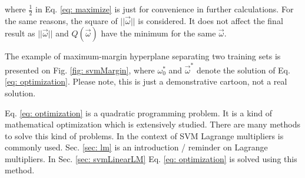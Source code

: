 where $\frac{1}{2}$ in Eq. \ref{eq: maximize} is just for convenience in further calculations. For the same reasons, the square of $||\vec\omega||$ is considered. It does not affect the final result as $||\vec\omega||$ and $Q(\vec\omega)$ have the minimum for the same $\vec\omega$. 

The example of maximum-margin hyperplane separating two training sets is presented on Fig. \ref{fig: svmMargin}, where $\omega_0^*$ and $\vec\omega^*$ denote the solution of Eq. \ref{eq: optimization}. Please note, this is just a demonstrative cartoon, not a real solution.

Eq. \ref{eq: optimization} is a quadratic programming problem. It is a kind of mathematical optimization which is extensively studied. There are many methods to solve this kind of problems. In the context of SVM Lagrange multipliers is commonly used. Sec. \ref{sec: lm} is an introduction / reminder on Lagrange multipliers. In Sec. \ref{sec: svmLinearLM} Eq. \ref{eq: optimization} is solved using this method.
